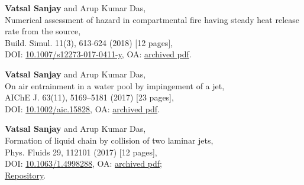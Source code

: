 \documentclass[10pt,a4paper,colorlinks,linkcolor=blue,urlcolor=blue,citecolor=blue]{moderncv}
\begin{document}
\begin{enumerate}[leftmargin=1.5em,label=\textbf{[\arabic*]}]
	\item \textbf{Vatsal Sanjay} and Arup Kumar Das,\\
	Numerical assessment of hazard in compartmental fire having steady heat release rate from the source,\\
	Build. Simul. 11(3), 613-624 (2018) [12 pages],\\
	\faLock\hspace{0.2em}DOI: \href{https://doi.org/10.1007/s12273-017-0411-y}{10.1007/s12273-017-0411-y}, \faFile\hspace{0.2em}OA: \href{https://tinyurl.com/2bwhzlzv}{archived pdf}.

	\item \textbf{Vatsal Sanjay} and Arup Kumar Das,\\
	On air entrainment in a water pool by impingement of a jet,\\
	AIChE J. 63(11), 5169--5181 (2017) [23 pages],\\
	\faLock\hspace{0.2em}DOI: \href{https://doi.org/10.1002/aic.15828}{10.1002/aic.15828}, \faFile\hspace{0.2em}OA: \href{https://tinyurl.com/24ne4oql}{archived pdf}.

	\item \textbf{Vatsal Sanjay} and Arup Kumar Das,\\
	Formation of liquid chain by collision of two laminar jets,\\
	Phys. Fluids 29, 112101 (2017) [12 pages],\\
	\faLock\hspace{0.2em}DOI: \href{https://doi.org/10.1063/1.4998288}{10.1063/1.4998288}, \faFile\hspace{0.2em}OA: \href{https://tinyurl.com/27sd7lgo}{archived pdf};\\
	\faGithub\hspace{0.2em}\href{https://github.com/VatsalSy/FluidChains}{Repository}.

\end{enumerate}

\end{document}

